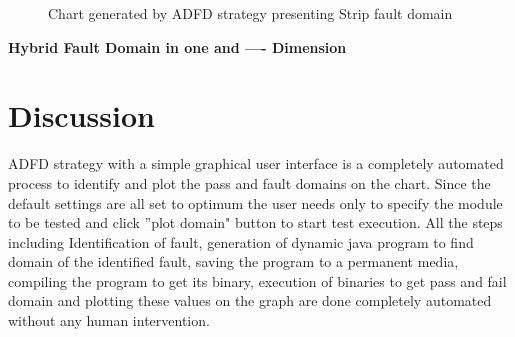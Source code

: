 \documentclass{acm_proc_article-sp}
\begin{document}
%
\begin{figure} [H]



\caption{Chart generated by ADFD strategy presenting Strip fault domain}
\end{figure}




\twocolumn

\textbf{ Hybrid Fault Domain in one and ---- Dimension }

\section{Discussion} \label{sec:discussion}

ADFD strategy with a simple graphical user interface is a completely automated process to identify and plot the pass and fault domains on the chart. Since the default settings are all set to optimum the user needs only to specify the module to be tested and click ''plot domain" button to start test execution. All the steps including Identification of fault, generation of dynamic java program to find domain of the identified fault, saving the program to a permanent media, compiling the program to get its binary, execution of binaries to get pass and fail domain and plotting these values on the graph are done completely automated without any human intervention.
\end{document}
